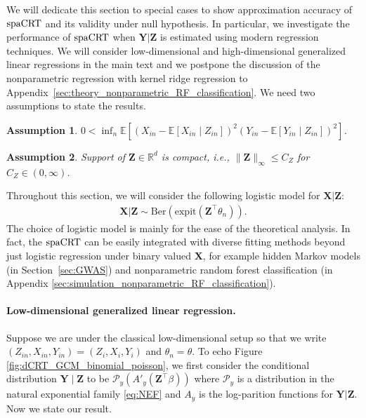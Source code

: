 \documentclass[12pt]{article}
\newtheorem{assumption}{Assumption}
\theoremstyle{definition}
\newcommand{\E}{\mathbb E}								%
\newcommand{\expit}{\mathrm{expit}}                 	%
\newcommand{\prx}{\bm X}								%
\newcommand{\srx}{X}									%
\newcommand{\prz}{\bm Z}								%
\newcommand{\srz}{Z}									%
\newcommand{\pry}{{\bm Y}}								%
\newcommand{\sry}{Y}									%
\newcommand{\spacrt}{\textnormal{spaCRT}}               %
\begin{document}
  We will dedicate this section to special cases to show approximation accuracy of $\spacrt$ and its validity under null hypothesis. In particular, we investigate the performance of $\spacrt$ when $\pry|\prz$ is estimated using modern regression techniques. We will consider low-dimensional and high-dimensional generalized linear regressions in the main text and we postpone the discussion of the nonparametric regression with kernel ridge regression to Appendix~\ref{sec:theory_nonparametric_RF_classification}. We need two assumptions to state the results.
  \begin{assumption}\label{assu:non_degeneracy_variance}
  $0<\inf_n\E[(\srx_{in}-\E[\srx_{in}\mid \srz_{in}])^2(\sry_{in}-\E[\sry_{in}\mid \srz_{in}])^{2}]$.
  \end{assumption}
  
  \begin{assumption}\label{assu:compact_support_Z}
	Support of $\prz\in\mathbb{R}^d$ is compact, i.e., $\|\prz\|_{\infty}\leq C_Z$ for $C_Z\in(0,\infty)$.
  \end{assumption}
  
  \noindent Throughout this section, we will consider the following logistic model for $\prx|\prz$:
  \begin{align*}
	\prx|\prz\sim \mathrm{Ber}(\expit(\prz^\top \theta_n)).
  \end{align*}
  The choice of logistic model is mainly for the ease of the theoretical analysis. In fact, the $\spacrt$ can be easily integrated with diverse fitting methods beyond just logistic regression under binary valued $\prx$, for example hidden Markov models (in Section~\ref{sec:GWAS}) and nonparametric random forest classification (in Appendix \ref{sec:simulation_nonparametric_RF_classification}).
  
  
  \paragraph{Low-dimensional generalized linear regression.}
  
  Suppose we are under the classical low-dimensional setup so that we write $(\srz_{in},\srx_{in},\sry_{in})=(\srz_{i},\srx_{i},\sry_{i})$ and $\theta_n=\theta$. To echo Figure \ref{fig:dCRT_GCM_binomial_poisson}, we first consider the conditional distribution $\pry\mid\prz$ to be $\mathcal{P}_y(A'_y(\prz^\top\beta))$ where $\mathcal{P}_y$ is a distribution in the natural exponential family \eqref{eq:NEF} and $A_y$ is the log-parition functions for $\pry|\prz$. Now we state our result.
  
\end{document}
